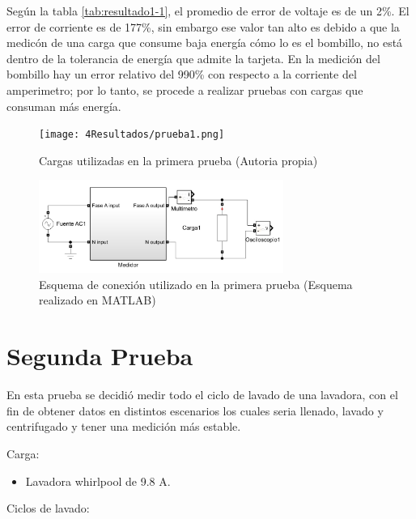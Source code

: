 Según la tabla \ref{tab:resultado1-1}, el promedio de error de voltaje es de un 2\%. El error de corriente es de 177\%, sin embargo ese valor tan alto es debido a que la medicón de una carga que consume baja energía cómo lo es el bombillo, no está dentro de la tolerancia de energía que admite la tarjeta. En la medición del bombillo hay un error relativo del 990\% con respecto a la corriente del amperimetro; por lo tanto, se procede a realizar pruebas con cargas que consuman más energía.
\begin{figure}[H]
  \begin{center}
      \texttt{[image: 4Resultados/prueba1.png]}
      \caption{ Cargas utilizadas en la primera prueba (Autoria propia)} 
      \label{fig:montaje1}
 \end{center}
\end{figure}
\begin{figure}[H]
  \begin{center}
      \includegraphics[width = 8cm]{4Resultados/conexion1.jpeg}
      \caption{ Esquema de conexión utilizado en la primera prueba (Esquema realizado en MATLAB) } 
      \label{fig:conexion1}
 \end{center}
\end{figure}
  
\section{Segunda Prueba}
  
En esta prueba se decidió medir todo el ciclo de lavado de una lavadora, con el fin de obtener datos en distintos escenarios los cuales seria llenado, lavado y centrifugado y tener una medición más estable.

Carga:

\begin{itemize}
  \itemsep0em
  \item Lavadora whirlpool de 9.8 A.
\end{itemize}

Ciclos de lavado:


